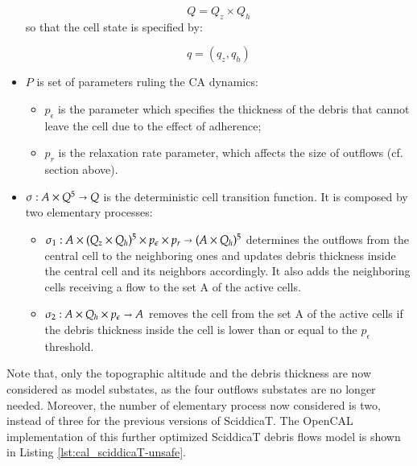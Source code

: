 \begin{itemize}
$$Q = Q_z \times Q_h$$
so that the cell state is specified by:

$$ q = (q_z, q_h)$$

\item   $P$ is set of parameters ruling the CA dynamics:

\begin{itemize}
    \item   $p_\epsilon$ is the parameter which specifies the thickness of the debris that cannot leave the cell due to the effect of adherence;
    \item   $p_r$ is the relaxation rate parameter, which affects the size of outflows (cf. section above).
\end{itemize}

\item $\sigma : A \times Q^5 \shortrightarrow Q$ is the deterministic cell
  transition function. It is composed by two elementary processes:
\begin{itemize}
\item $\sigma_1 : A \times (Q_z \times Q_h)^5 \times p_\epsilon \times
  p_r\shortrightarrow (A \times Q_h)^5$ determines the outflows from
  the central cell to the neighboring ones and updates debris
  thickness inside the central cell and its neighbors accordingly. It
  also adds the neighboring cells receiving a flow to the set A of the
  active cells.

\item $\sigma_2: A \times Q_h \times p_\epsilon \shortrightarrow A$ removes the
  cell from the set A of the active cells if the debris thickness
  inside the cell is lower than or equal to the $p_\epsilon$
  threshold.

\end{itemize}
\end{itemize}

Note that, only the topographic altitude and the debris thickness are
now considered as model substates, as the four outflows substates
are no longer needed. Moreover, the number of elementary process now
considered is two, instead of three for the previous versions of
SciddicaT. The OpenCAL implementation of this further optimized
SciddicaT debris flows model is shown in Listing
\ref{lst:cal_sciddicaT-unsafe}.



